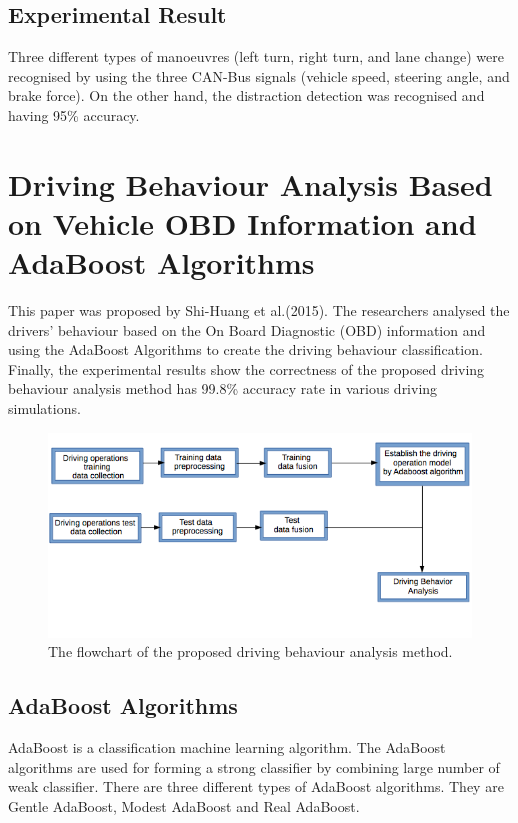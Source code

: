 \subsection{Experimental Result}
Three different types of manoeuvres (left turn, right turn, and lane change) were recognised by using the three CAN-Bus signals (vehicle speed, steering angle, and brake force). On the other hand, the distraction detection was recognised and having 95\% accuracy.


\section{Driving Behaviour Analysis Based on Vehicle OBD Information and AdaBoost Algorithms}
This paper was proposed by Shi-Huang et al.(2015). The researchers analysed the drivers' behaviour based on the On Board Diagnostic (OBD) information and using the AdaBoost Algorithms to create the driving  behaviour classification. Finally, the experimental results show the correctness of the proposed driving behaviour analysis method has 99.8\% accuracy rate in various driving simulations.

\begin{figure}[hbt!]\centering
\includegraphics[width=.75\textwidth]{image/adaboost_flowchart}
\caption{The flowchart of the proposed driving behaviour analysis method.}
\end{figure}

\subsection{AdaBoost Algorithms}
AdaBoost is a classification machine learning algorithm. The AdaBoost algorithms are used for forming a strong classifier by combining large number of weak classifier. There are three different types of AdaBoost algorithms. They are Gentle AdaBoost, Modest AdaBoost and Real AdaBoost.


